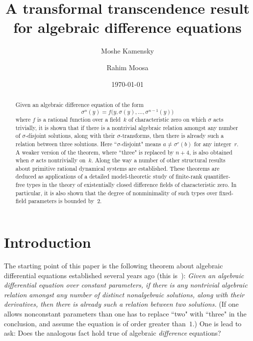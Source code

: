 \documentclass[\DocOpts]{amsart}
\date{\today}
\title[A transformal transcendence result]{A transformal transcendence result for algebraic difference equations}
\author{Moshe Kamensky}
\author{Rahim Moosa}
\providecommand{\pagewiselinenumbers}{\relax}
\theoremstyle{definition}
\newcommand{\<}{\langle}
\renewcommand{\>}{\rangle}
\begin{document}

\begin{abstract}
Given an algebraic difference equation of the form
$$\sigma^n(y)=f\big(y, \sigma(y),\dots,\sigma^{n-1}(y)\big)$$
where $f$ is a rational function over a field~$k$ of characteristic zero on which $\sigma$ acts trivially,
it is shown that if there is a nontrivial algebraic relation amongst any number of $\sigma$-disjoint solutions, along with their $\sigma$-transforms, then there is already such a relation between three solutions.
Here ``$\sigma$-disjoint" means $a\neq\sigma^r(b)$ for any integer~$r$.
A weaker version of the theorem, where ``three" is replaced by $n+4$, is also obtained when $\sigma$ acts nontrivially on~$k$.
Along the way a number of other structural results about primitive rational dynamical systems are established.
These theorems are deduced as applications of a detailed model-theoretic study of finite-rank quantifier-free types in the theory of existentially closed difference fields of characteristic zero.
In particular, it is also shown that the degree of nonminimality of such types over fixed-field parameters is bounded by~$2$.
\end{abstract}


\maketitle

\setcounter{tocdepth}{1}
\tableofcontents



\vfill
\pagebreak
\section{Introduction}

\noindent
The starting point of this paper is the following theorem about algebraic differential equations established several years ago (this is~\cite[Theorem A]{c3}):
{\em Given an algebraic differential equation over constant parameters, if there is any nontrivial algebraic relation amongst any number of distinct nonalgebraic solutions, along with their derivatives, then there is already such a relation between two solutions.}
(If one allows nonconstant parameters than one has to replace ``two" with ``three" in the conclusion, and assume the equation is of order greater than~$1$.)
One is lead to ask: Does the analogous fact hold true of algebraic {\em difference} equations?
\end{document}
